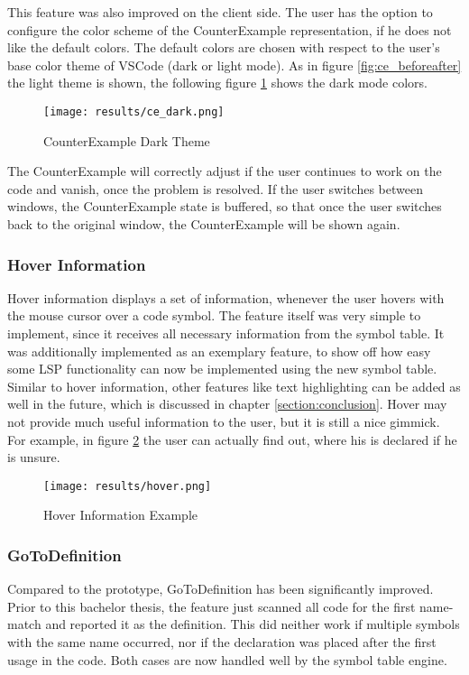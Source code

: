 This feature was also improved on the client side.
The user has the option to configure the color scheme of the CounterExample representation, if he does not like the default colors.
The default colors are chosen with respect to the user's base color theme of VSCode (dark or light mode).
As in figure \ref{fig:ce_beforeafter} the light theme is shown,
the following figure \ref{fig:ce_dark} shows the dark mode colors.

\begin{figure}[H]
    \centering
    \texttt{[image: results/ce\_dark.png]}
    \caption{CounterExample Dark Theme}
    \label{fig:ce_dark}
\end{figure}

The CounterExample will correctly adjust if the user continues to work on the code and vanish, once the problem is resolved.
If the user switches between windows, the CounterExample state is buffered, so that once the user switches back to the original window, the CounterExample will be shown again.

\subsubsection{Hover Information}
Hover information displays a set of information, whenever the user hovers with the mouse cursor over a code symbol.
The feature itself was very simple to implement, since it receives all necessary information from the symbol table.
It was additionally implemented as an exemplary feature, to show off how easy some LSP functionality can now be implemented using the new symbol table.
Similar to hover information, other features like text highlighting can be added as well in the future, which is discussed in chapter \ref{section:conclusion}.
Hover may not provide much useful information to the user, but it is still a nice gimmick.
For example, in figure \ref{fig:hover} the user can actually find out, where his  is declared if he is unsure.
\begin{figure}[H]
    \centering
    \texttt{[image: results/hover.png]}
    \caption{Hover Information Example}
    \label{fig:hover}
\end{figure}

\subsubsection{GoToDefinition}
Compared to the prototype, GoToDefinition has been significantly improved.
Prior to this bachelor thesis, the feature just scanned all code for the first name-match and reported it as the definition.
This did neither work if multiple symbols with the same name occurred, nor if the declaration was placed after the first usage in the code.
Both cases are now handled well by the symbol table engine.\\


